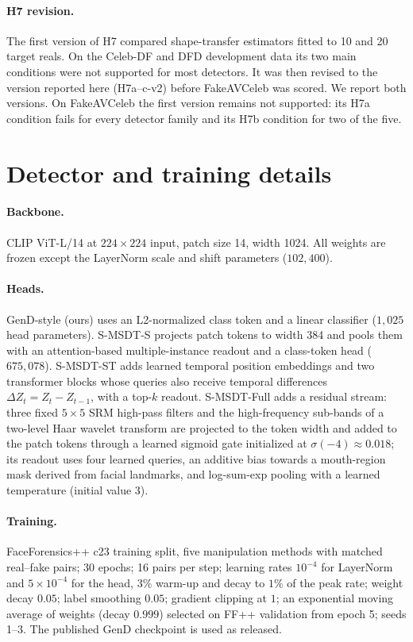 \paragraph{H7 revision.} The first version of H7 compared shape-transfer estimators fitted to 10 and 20 target reals. On the Celeb-DF and DFD development data its two main conditions were not supported for most detectors. It was then revised to the version reported here (H7a--c-v2) before FakeAVCeleb was scored. We report both versions. On FakeAVCeleb the first version remains not supported: its H7a condition fails for every detector family and its H7b condition for two of the five.

\section{Detector and training details}
\label{app:models}

\paragraph{Backbone.} CLIP ViT-L/14 at $224\times224$ input, patch size 14, width 1024. All weights are frozen except the LayerNorm scale and shift parameters ($102{,}400$).

\paragraph{Heads.} GenD-style (ours) uses an L2-normalized class token and a linear classifier ($1{,}025$ head parameters). S-MSDT-S projects patch tokens to width 384 and pools them with an attention-based multiple-instance readout and a class-token head ($675{,}078$). S-MSDT-ST adds learned temporal position embeddings and two transformer blocks whose queries also receive temporal differences $\Delta Z_t=Z_t-Z_{t-1}$, with a top-$k$ readout. S-MSDT-Full adds a residual stream: three fixed $5\times5$ SRM high-pass filters \citep{fridrich2012rich} and the high-frequency sub-bands of a two-level Haar wavelet transform are projected to the token width and added to the patch tokens through a learned sigmoid gate initialized at $\sigma(-4)\approx0.018$; its readout uses four learned queries, an additive bias towards a mouth-region mask derived from facial landmarks, and log-sum-exp pooling with a learned temperature (initial value 3).

\paragraph{Training.} FaceForensics++ c23 training split, five manipulation methods with matched real--fake pairs; 30 epochs; 16 pairs per step; learning rates $10^{-4}$ for LayerNorm and $5\times10^{-4}$ for the head, $3\%$ warm-up and decay to $1\%$ of the peak rate; weight decay $0.05$; label smoothing $0.05$; gradient clipping at $1$; an exponential moving average of weights (decay $0.999$) selected on FF++ validation from epoch 5; seeds 1--3. The published GenD checkpoint is used as released.

